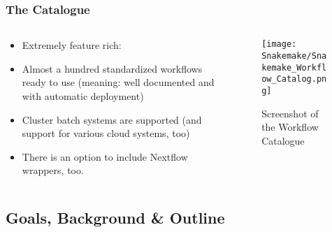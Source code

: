 \begin{frame}
  \frametitle{The \Snakemake{} Catalogue}
  \begin{columns}
    \begin{column}{0.5\textwidth}
      \begin{itemize}[<+->]
   \item Extremely feature rich: 
   \item Almost a hundred standardized workflows ready to use (meaning: well documented and with automatic deployment)
   \item Cluster batch systems are supported (and support for various cloud systems, too)
   \item There is an option to include Nextflow wrappers, too.
      \end{itemize}
    \end{column}
    \begin{column}{0.5\textwidth}
      \begin{figure}
        \texttt{[image: Snakemake/Snakemake\_Workflow\_Catalog.png]}
        \caption{Screenshot of the Workflow Catalogue}
      \end{figure}
    \end{column}
  \end{columns}
\end{frame}


\subsection{Goals, Background \& Outline}

